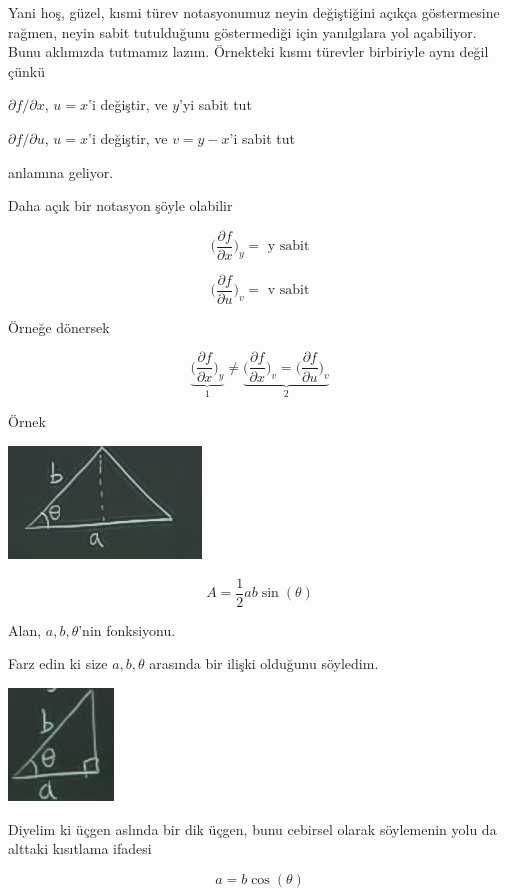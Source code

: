 \documentclass[12pt,fleqn]{article}\usepackage{../../common}
\begin{document}
Yani hoş, güzel, kısmi türev notasyonumuz neyin değiştiğini açıkça
göstermesine rağmen, neyin sabit tutulduğunu göstermediği için yanılgılara
yol açabiliyor. Bunu aklımızda tutmamız lazım. Örnekteki kısmı türevler
birbiriyle aynı değil çünkü 

$\partial f/\partial x$, $u=x$'i değiştir, ve $y$'yi sabit tut

$\partial f/\partial u$, $u=x$'i değiştir, ve $v = y-x$'i sabit tut

anlamına geliyor. 

Daha açık bir notasyon şöyle olabilir

$$ 
\bigg( \frac{\partial f}{\partial x}  \bigg)_y = \textrm { y sabit}
$$

$$ 
\bigg( \frac{\partial f}{\partial u}  \bigg)_v = \textrm { v sabit}
$$

Örneğe dönersek

$$ 
\underbrace{
\bigg( \frac{\partial f}{\partial x}  \bigg)_y 
}_{1} 
\ne 
\underbrace{
\bigg( \frac{\partial f}{\partial x}  \bigg)_v = 
\bigg( \frac{\partial f}{\partial u}  \bigg)_v 
}_{2}
$$

Örnek
\begin{center}
\includegraphics[height=3cm]{14_1.png}
\end{center}
$$ A = \frac{1}{2}ab \sin(\theta) $$

Alan, $a,b,\theta$'nin fonksiyonu. 

Farz edin ki size $a,b,\theta$ arasında bir ilişki olduğunu söyledim. 

\begin{center}
\includegraphics[height=3cm]{14_2.png}
\end{center}

Diyelim ki üçgen aslında bir dik üçgen, bunu cebirsel olarak söylemenin yolu da
alttaki kısıtlama ifadesi

$$ a = b \cos(\theta) $$
\end{document}
